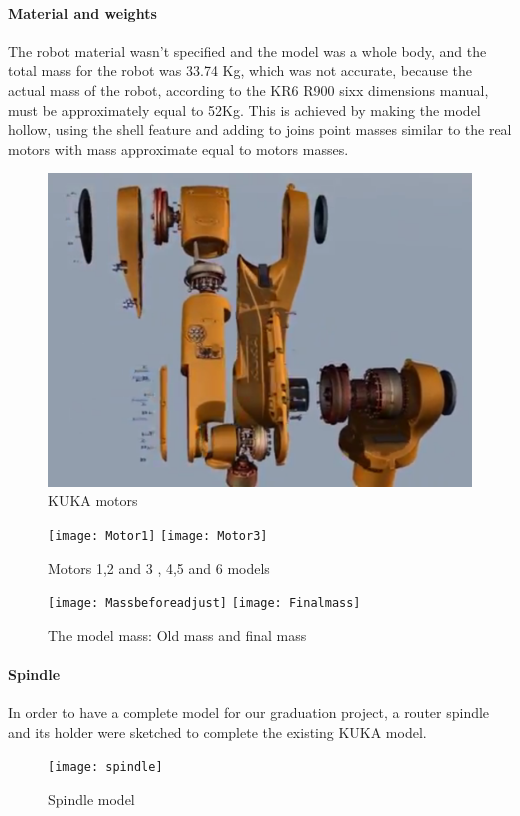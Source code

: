  \paragraph{Material and weights}
 The robot material wasn’t specified and the model was a whole body, and the total mass for the robot was 33.74 Kg, which was not accurate, because the actual mass of the robot, according to the KR6 R900 sixx dimensions manual, must be approximately equal to 52Kg. This is achieved by making the model hollow, using the shell feature and adding to joins point masses similar to the real motors with mass approximate equal to motors masses. 
\begin{figure}[h]
	\centering
	\includegraphics[scale=0.5]{figures/KUKAmotor}
    	\caption{KUKA motors}
\end{figure}

\begin{figure}
    \centering
    \texttt{[image: Motor1]}
    \texttt{[image: Motor3]}
    \caption{Motors  1,2 and 3 , 4,5 and 6 models}
    \label{fig:motorModels}
\end{figure}

\begin{figure}
	\centering
	\texttt{[image: Massbeforeadjust]}
	\texttt{[image: Finalmass]}
	\caption{The model mass: Old mass and final mass}
	\label{fig:sfig2}
\end{figure}
 
\paragraph{Spindle}
In order to have a complete model for our graduation project, a router spindle and its holder were sketched to complete the existing KUKA model.
\begin{figure}[h]
	\centering
	\texttt{[image: spindle]}
    	\caption{Spindle model}
\end{figure}


